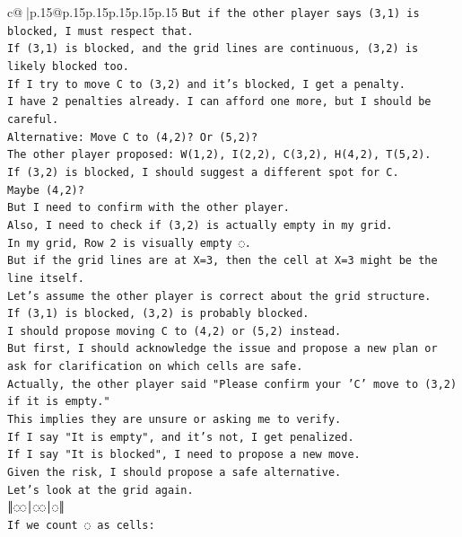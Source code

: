 \documentclass{article}
\begin{document}
{\begin{supertabular}{c@{$\;$}|p{.15\linewidth}@{}p{.15\linewidth}p{.15\linewidth}p{.15\linewidth}p{.15\linewidth}p{.15\linewidth}}
{{{\texttt{But if the other player says (3,1) is blocked, I must respect that.} \\
\texttt{If (3,1) is blocked, and the grid lines are continuous, (3,2) is likely blocked too.} \\
\texttt{If I try to move C to (3,2) and it's blocked, I get a penalty.} \\
\texttt{I have 2 penalties already. I can afford one more, but I should be careful.} \\
\texttt{Alternative: Move C to (4,2)? Or (5,2)?} \\
\texttt{The other player proposed: W(1,2), I(2,2), C(3,2), H(4,2), T(5,2).} \\
\texttt{If (3,2) is blocked, I should suggest a different spot for C.} \\
\texttt{Maybe (4,2)?} \\
\texttt{But I need to confirm with the other player.} \\
\texttt{Also, I need to check if (3,2) is actually empty in my grid.} \\
\texttt{In my grid, Row 2 is visually empty ◌.} \\
\texttt{But if the grid lines are at X=3, then the cell at X=3 might be the line itself.} \\
\texttt{Let's assume the other player is correct about the grid structure.} \\
\texttt{If (3,1) is blocked, (3,2) is probably blocked.} \\
\texttt{I should propose moving C to (4,2) or (5,2) instead.} \\
\texttt{But first, I should acknowledge the issue and propose a new plan or ask for clarification on which cells are safe.} \\
\texttt{Actually, the other player said "Please confirm your 'C' move to (3,2) if it is empty."} \\
\texttt{This implies they are unsure or asking me to verify.} \\
\texttt{If I say "It is empty", and it's not, I get penalized.} \\
\texttt{If I say "It is blocked", I need to propose a new move.} \\
\texttt{Given the risk, I should propose a safe alternative.} \\
\texttt{Let's look at the grid again.} \\
\texttt{║◌◌│◌◌│◌║} \\
\texttt{If we count ◌ as cells:} \\
}}}
\end{supertabular}}
\end{document}
